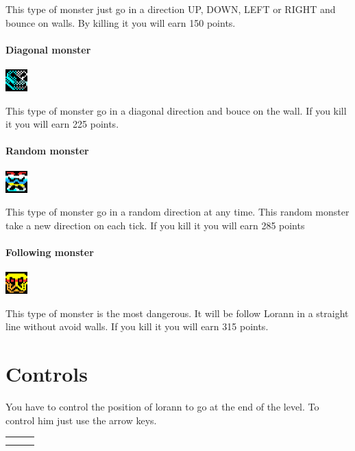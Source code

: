 \documentclass{report}
\begin{document}
This type of monster just go in a direction UP, DOWN, LEFT or RIGHT and bounce on walls. By killing it you will earn 150 points.

\paragraph{Diagonal monster}
\hspace{\fill}\includegraphics{resources/sprites/monster_2.png}

This type of monster go in a diagonal direction and bouce on the wall. If you kill it you will earn 225 points.

\paragraph{Random monster}
\hspace{\fill}\includegraphics{resources/sprites/monster_3.png}

This type of monster go in a random direction at any time. This random monster take a new direction on each tick. If you kill it you will earn 285 points

\paragraph{Following monster}
\hspace{\fill}\includegraphics{resources/sprites/monster_4.png}

This type of monster is the most dangerous. It will be follow Lorann in a straight line without avoid walls. If you kill it you will earn 315 points.

\section{Controls}

You have to control the position of lorann to go at the end of the level. To control him just use the arrow keys.

\begin{center}
\begin{tabular}{ccc}
& \keys{\arrowkeyup} & \\[4mm]
\keys{\arrowkeyleft} & \keys{\arrowkeydown} & \keys{\arrowkeyright} \\
\end{tabular}
\end{center}
\end{document}
